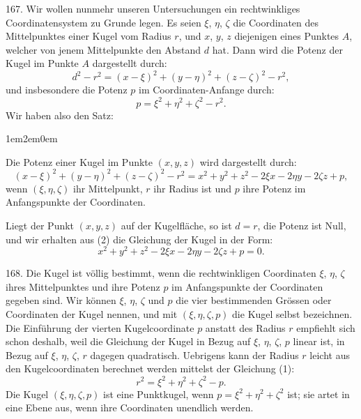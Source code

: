 \hspace{\parindent}%
167. Wir wollen nunmehr unseren Untersuchungen ein
rechtwinkliges Coordinatensystem zu Grunde legen. Es seien
$\xi$, $\eta$, $\zeta$ die Coordinaten des Mittelpunktes einer Kugel vom
Radius $r$, und $x$, $y$, $z$ diejenigen eines Punktes $A$, welcher
von jenem Mittelpunkte den Abstand $d$ hat. Dann wird die
Potenz der Kugel im Punkte $A$ dargestellt durch:
\[
d^2 - r^2 = (x-\xi)^2 + (y-\eta)^2 + (z-\zeta)^2 - r^2,
\]
und insbesondere die Potenz $p$ im Coordinaten-Anfange durch:
\[
\tag{1}
  p = \xi^2 + \eta^2 + \zeta^2 - r^2.
\]
Wir haben also den Satz:
\begin{list}{}{\leftmargin1em\rightmargin2em\topsep0em}\item
{\glqq}Die Potenz einer Kugel im Punkte $(x, y, z)$ wird
dargestellt durch:
\[
\tag{2}
(x-\xi)^2 + (y-\eta)^2 + (z-\zeta)^2 - r^2
= x^2 + y^2 + z^2 - 2\xi x - 2\eta y - 2\zeta z + p,
\]
wenn $(\xi,\eta,\zeta)$ ihr Mittelpunkt, $r$ ihr Radius ist und
$p$ ihre Potenz im Anfangspunkte der Coordinaten.{\grqq}
\end{list}
Liegt der Punkt $(x, y, z)$ auf der Kugelfl\"ache, so ist
$d = r$, die Potenz ist Null, und wir erhalten aus (2) die
Gleichung der Kugel in der Form:
\[
\tag{3}
x^2 + y^2 + z^2 - 2\xi x - 2\eta y - 2\zeta z + p = 0.
\]

168. Die Kugel ist v\"ollig bestimmt, wenn die rechtwinkligen
Coordinaten $\xi$, $\eta$, $\zeta$ ihres Mittelpunktes und ihre
Potenz $p$ im Anfangspunkte der Coordinaten gegeben sind.
Wir k\"onnen $\xi$, $\eta$, $\zeta$ und $p$ die vier {\glqq}bestimmenden Gr\"ossen{\grqq}
oder {\glqq}Coordinaten{\grqq} der Kugel nennen, und mit $(\xi, \eta, \zeta, p)$
die Kugel selbst bezeichnen. Die Einf\"uhrung der vierten
Kugelcoordinate $p$ anstatt des Radius $r$ empfiehlt sich schon
deshalb, weil die Gleichung der Kugel in Bezug auf $\xi$, $\eta$, $\zeta$, $p$
linear ist, in Bezug auf $\xi$, $\eta$, $\zeta$, $r$ dagegen quadratisch.
Uebrigens kann der Radius $r$ leicht aus den Kugelcoordinaten
berechnet werden mittelst der Gleichung (1):
\[
r^2 = \xi^2 + \eta^2 + \zeta^2 - p.
\]
Die Kugel $(\xi, \eta, \zeta, p)$ ist eine Punktkugel, wenn $p = \xi^2+\eta^2+\zeta^2$
ist; sie artet in eine Ebene aus, wenn ihre Coordinaten unendlich
werden.

